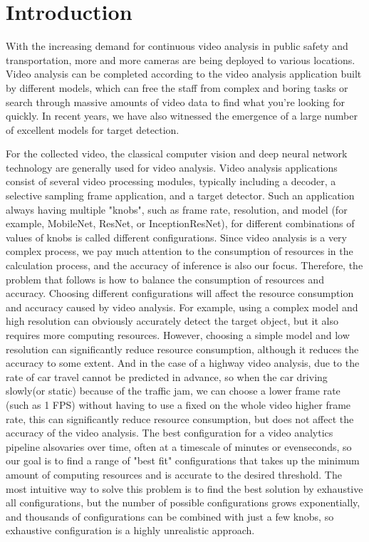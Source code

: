 \section{Introduction}
\label{Section: introduction}
With the increasing demand for continuous video analysis in public safety and transportation, more and more cameras are being deployed to various locations. Video analysis can be completed according to the video analysis application built by different models, which can free the staff from complex and boring tasks or search through massive amounts of video data to find what you're looking for quickly. In recent years, we have also witnessed the emergence of a large number of excellent models for target detection.

For the collected video, the classical computer vision and deep neural network technology are generally used for video analysis. Video analysis applications consist of several video processing modules, typically including a decoder, a selective sampling frame application, and a target detector. Such an application always having multiple "knobs", such as frame rate, resolution, and model (for example, MobileNet, ResNet, or InceptionResNet), for different combinations of values of knobs is called different configurations. Since video analysis is a very complex process, we pay much attention to the consumption of resources in the calculation process, and the accuracy of inference is also our focus. Therefore, the problem that follows is how to balance the consumption of resources and accuracy. Choosing different configurations will affect the resource consumption and accuracy caused by video analysis. For example, using a complex model and high resolution can obviously accurately detect the target object, but it also requires more computing resources. However, choosing a simple model and low resolution can significantly reduce resource consumption, although it reduces the accuracy to some extent. And in the case of a highway video analysis, due to the rate of car travel cannot be predicted in advance, so when the car driving slowly(or static) because of the traffic jam, we can choose a lower frame rate (such as 1 FPS) without having to use a fixed on the whole video higher frame rate, this can significantly reduce resource consumption, but does not affect the accuracy of the video analysis. The best configuration for a video analytics pipeline alsovaries over time, often at a timescale of minutes or evenseconds\cite{jiang2018chameleon}, so our goal is to find a range of "best fit" configurations that takes up the minimum amount of computing resources and is accurate to the desired threshold. The most intuitive way to solve this problem is to find the best solution by exhaustive all configurations, but the number of possible configurations grows exponentially, and thousands of configurations can be combined with just a few knobs, so exhaustive configuration is a highly unrealistic approach.

